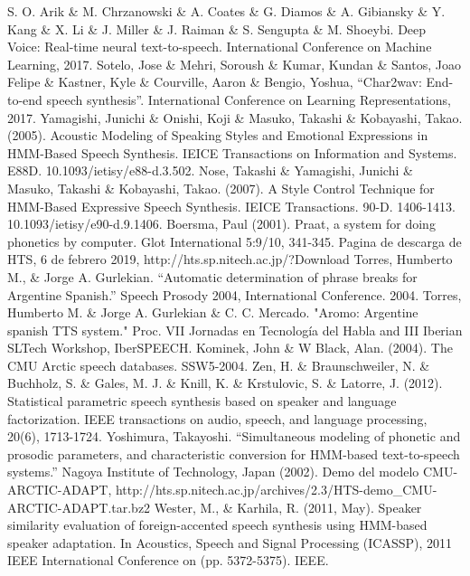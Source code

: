 \begin{thebibliography}{9}
 S. O. Arik \& M. Chrzanowski \& A. Coates \& G. Diamos \& A. Gibiansky \& Y. Kang \& X. Li \& J. Miller \& J. Raiman \& S. Sengupta \& M. Shoeybi. Deep Voice: Real-time neural text-to-speech. International Conference on Machine Learning, 2017.
 Sotelo, Jose \& Mehri, Soroush \& Kumar, Kundan \& Santos, Joao Felipe \& Kastner, Kyle \& Courville, Aaron \& Bengio, Yoshua, ``Char2wav: End-to-end speech synthesis''. International Conference on Learning Representations, 2017.
 Yamagishi, Junichi \& Onishi, Koji \& Masuko, Takashi \& Kobayashi, Takao. (2005). Acoustic Modeling of Speaking Styles and Emotional Expressions in HMM-Based Speech Synthesis. IEICE Transactions on Information and Systems. E88D. 10.1093/ietisy/e88-d.3.502. 
 Nose, Takashi \& Yamagishi, Junichi \& Masuko, Takashi \& Kobayashi, Takao. (2007). A Style Control Technique for HMM-Based Expressive Speech Synthesis. IEICE Transactions. 90-D. 1406-1413. 10.1093/ietisy/e90-d.9.1406. 
 Boersma, Paul (2001). Praat, a system for doing phonetics by computer. Glot International 5:9/10, 341-345.
 Pagina de descarga de HTS, 6 de febrero 2019, http://hts.sp.nitech.ac.jp/?Download
 Torres, Humberto M., \& Jorge A. Gurlekian. ``Automatic determination of phrase breaks for Argentine Spanish.'' Speech Prosody 2004, International Conference. 2004.
 Torres, Humberto M. \& Jorge A. Gurlekian \& C. C. Mercado. "Aromo: Argentine spanish TTS system." Proc. VII Jornadas en Tecnología del Habla and III Iberian SLTech Workshop, IberSPEECH.
 Kominek, John \& W Black, Alan. (2004). The CMU Arctic speech databases. SSW5-2004.
 Zen, H. \& Braunschweiler, N. \& Buchholz, S. \& Gales, M. J. \& Knill, K.  \& Krstulovic, S. \& Latorre, J. (2012). Statistical parametric speech synthesis based on speaker and language factorization. IEEE transactions on audio, speech, and language processing, 20(6), 1713-1724.
 Yoshimura, Takayoshi. ``Simultaneous modeling of phonetic and prosodic parameters, and characteristic conversion for HMM-based text-to-speech systems.'' Nagoya Institute of Technology, Japan (2002).
 Demo del modelo CMU-ARCTIC-ADAPT,  http://hts.sp.nitech.ac.jp/archives/2.3/HTS-demo\_CMU-ARCTIC-ADAPT.tar.bz2
 Wester, M., \& Karhila, R. (2011, May). Speaker similarity evaluation of foreign-accented speech synthesis using HMM-based speaker adaptation. In Acoustics, Speech and Signal Processing (ICASSP), 2011 IEEE International Conference on (pp. 5372-5375). IEEE.

\end{thebibliography}
